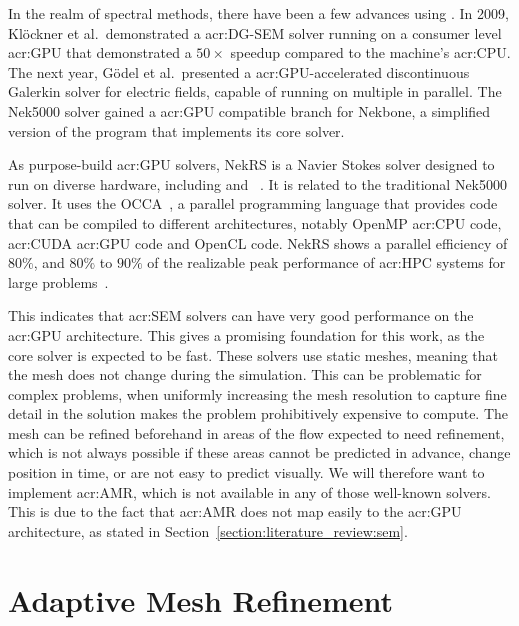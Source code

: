 In the realm of spectral methods, there have been a few advances using . In
2009, Klöckner et al.\ demonstrated a \acrshort{acr:DG-SEM} solver running on a consumer level
\acrshort{acr:GPU} that demonstrated a \(50 \times \) speedup compared to the machine's
\acrshort{acr:CPU}. The next year, Gödel et al.\ presented a \acrshort{acr:GPU}-accelerated discontinuous
Galerkin solver for electric fields, capable of running on multiple  in
parallel. The Nek5000 solver gained a \acrshort{acr:GPU} compatible branch for Nekbone, a simplified
version of the program that implements its core solver.

As purpose-build \acrshort{acr:GPU} solvers, NekRS is a Navier Stokes solver designed to run on
diverse hardware, including  and ~\cite{Fischer2021}. It is
related to the traditional Nek5000 solver. It uses the OCCA~\cite{Medina2014}, a parallel
programming language that provides code that can be compiled to different architectures, notably
OpenMP \acrshort{acr:CPU} code, \acrshort{acr:CUDA} \acrshort{acr:GPU} code and OpenCL code. NekRS
shows a parallel efficiency of \(80 \% \), and \(80 \% \) to \(90 \% \) of the realizable peak
performance of \acrshort{acr:HPC} systems for large problems~\cite{Fischer2021}.

This indicates that \acrshort{acr:SEM} solvers can have very good performance on the
\acrshort{acr:GPU} architecture. This gives a promising foundation for this work, as the core solver
is expected to be fast. These solvers use static meshes, meaning that the mesh does not change
during the simulation. This can be problematic for complex problems, when uniformly increasing the
mesh resolution to capture fine detail in the solution makes the problem prohibitively expensive to
compute. The mesh can be refined beforehand in areas of the flow expected to need refinement, which
is not always possible if these areas cannot be predicted in advance, change position in time, or
are not easy to predict visually. We will therefore want to implement \acrlong{acr:AMR}, which is
not available in any of those well-known solvers. This is due to the fact that \acrlong{acr:AMR}
does not map easily to the \acrshort{acr:GPU} architecture, as stated in
Section~\ref{section:literature_review:sem}. 

\section{Adaptive Mesh Refinement}\label{section:literature_review:amr}

